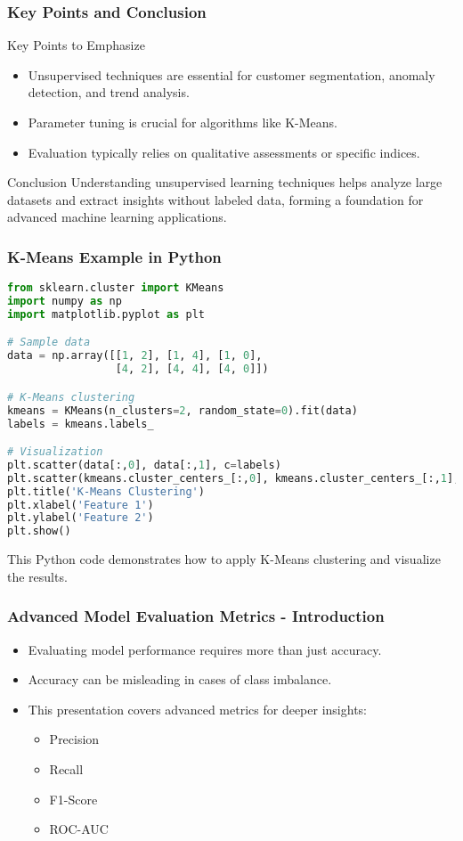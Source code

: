 \documentclass[aspectratio=169]{beamer}
\begin{document}
\begin{frame}[fragile]
    \frametitle{Key Points and Conclusion}
    \begin{block}{Key Points to Emphasize}
        \begin{itemize}
            \item Unsupervised techniques are essential for customer segmentation, anomaly detection, and trend analysis.
            \item Parameter tuning is crucial for algorithms like K-Means.
            \item Evaluation typically relies on qualitative assessments or specific indices.
        \end{itemize}
    \end{block}
    \begin{block}{Conclusion}
        Understanding unsupervised learning techniques helps analyze large datasets and extract insights without labeled data, forming a foundation for advanced machine learning applications.
    \end{block}
\end{frame}

\begin{frame}[fragile]
    \frametitle{K-Means Example in Python}
    \begin{lstlisting}[language=Python]
from sklearn.cluster import KMeans
import numpy as np
import matplotlib.pyplot as plt

# Sample data
data = np.array([[1, 2], [1, 4], [1, 0],
                 [4, 2], [4, 4], [4, 0]])

# K-Means clustering
kmeans = KMeans(n_clusters=2, random_state=0).fit(data)
labels = kmeans.labels_

# Visualization
plt.scatter(data[:,0], data[:,1], c=labels)
plt.scatter(kmeans.cluster_centers_[:,0], kmeans.cluster_centers_[:,1], s=300, c='red')
plt.title('K-Means Clustering')
plt.xlabel('Feature 1')
plt.ylabel('Feature 2')
plt.show()
    \end{lstlisting}
    This Python code demonstrates how to apply K-Means clustering and visualize the results.
\end{frame}

\begin{frame}[fragile]
    \frametitle{Advanced Model Evaluation Metrics - Introduction}
    \begin{itemize}
        \item Evaluating model performance requires more than just accuracy.
        \item Accuracy can be misleading in cases of class imbalance.
        \item This presentation covers advanced metrics for deeper insights:
        \begin{itemize}
            \item Precision
            \item Recall
            \item F1-Score
            \item ROC-AUC
        \end{itemize}
    \end{itemize}
\end{frame}
\end{document}
